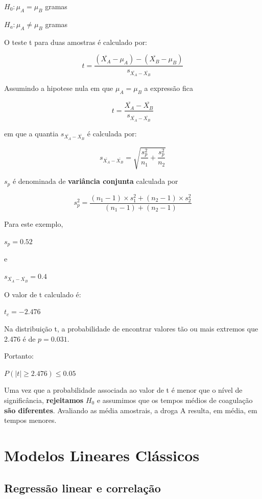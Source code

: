 \documentclass[
]{book}
\begin{document}
\(H_0: \mu_A = \mu_B\) gramas

\(H_a: \mu_A \ne \mu_B\) gramas

O teste t para duas amostras é calculado por:

\[t = \frac{(\overline{X_A} - \mu_A) - (\overline{X_B} - \mu_B)}{s_{\overline{X_A}-\overline{X_B}}}\]

Assumindo a hipotese nula em que \(\mu_A = \mu_B\) a expressão fica

\[t = \frac{\overline{X_A} - \overline{X_B}}{s_{\overline{X_A}-\overline{X_B}}}\]

em que a quantia \(s_{\overline{X_A}-\overline{X_B}}\) é calculada por:

\[s_{\overline{X_A}-\overline{X_B}} = \sqrt{\frac{s^2_{p}}{n_1} + \frac{s^2_{p}}{n_2}}\]

\(s_p\) é denominada de \textbf{variância conjunta} calculada por

\[s^2_p = \frac{(n_1 - 1) \times s^2_1 + (n_2 - 1) \times s^2_2}{(n_1 - 1) + (n_2 - 1)}\]

Para este exemplo,

\(s_p = 0.52\)

e

\(s_{\overline{X_A}-\overline{X_B}} = 0.4\)

O valor de t calculado é:

\(t_c = -2.476\)

Na distribuição t, a probabilidade de encontrar valores tão ou mais extremos que 2.476 é de \(p = 0.031\).

Portanto:

\(P(|t| \ge 2.476) \le 0.05\)

Uma vez que a probabilidade associada ao valor de t é menor que o nível de significância, \textbf{rejeitamos} \(H_0\) e assumimos que os tempos médios de coagulação \textbf{são diferentes}. Avaliando as média amostrais, a droga A resulta, em média, em tempos menores.

\hypertarget{part-modelos-lineares-cluxe1ssicos}{%
\part{Modelos Lineares Clássicos}\label{part-modelos-lineares-cluxe1ssicos}}

\hypertarget{regressao}{%
\chapter{Regressão linear e correlação}\label{regressao}}
\end{document}
